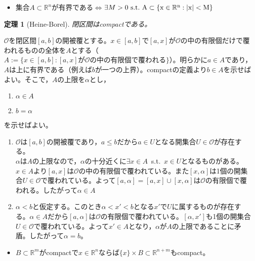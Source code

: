 \documentclass[dvipdfmx,a4j,10pt]{jsarticle}
\makeatletter
\theoremstyle{mystyle1}
\newtheorem{thm}[dfn]{定理}
\theoremstyle{mystyle2}
\renewenvironment{proof}[1][\proofname]{\par
  \pushQED{\qed}%
  \normalfont
  \topsep6\p@\@plus6\p@ \trivlist
  \item[\hskip\labelsep{\bfseries\sffamily #1}]\ignorespaces
}{%
  \popQED\endtrivlist\@endpefalse
}
\renewcommand\proofname{証明}
\makeatother
\begin{document}
\begin{itemize}
\item 集合$A\subset\mathbb{R}^n$が有界である$\Leftrightarrow$$\exists M>0\ \rm{s.t.}\ A\subset\{x\in\mathbb{R}^n:|x|<M\}$
\end{itemize}

\newpage

\begin{framed}
\begin{thm}[Heine-Borel]
    閉区間はcompactである。
\end{thm}
\end{framed}

\begin{proof}
$\mathscr{O}$を閉区間$[a,b]$の開被覆とする。$x\in[a,b]$で$[a,x]$が$\mathscr{O}$の中の有限個だけで覆われるものの全体を$A$とする（$A:=\{x\in[a,b]:[a,x]が\mathscr{O}の中の有限個で覆われる\}$）。明らかに$a\in A$であり，$A$は上に有界である（例えば$b$が一つの上界）。compactの定義より$b\in A$を示せばよい。そこで，$A$の上限を$\alpha$とし，
\begin{enumerate}
\item $\alpha\in A$
\item $b=\alpha$
\end{enumerate}
を示せばよい。
\begin{enumerate}
\item $\mathscr{O}$は$[a,b]$の開被覆であり，$a\leq b$だから$a\in U$となる開集合$U\in\mathscr{O}$が存在する。\\
$\alpha$は$A$の上限なので，$\alpha$の十分近くに$\exists x\in A$\ \rm{s.t.}\ $x\in U$となるものがある。$x\in A$より$[a,x]$は$\mathscr{O}$の中の有限個で覆われている。また$[x,\alpha]$は1個の開集合$U\in\mathscr{O}$で覆われている。よって$[a,\alpha]=[a,x]\cup[x,\alpha]$は$\mathscr{O}$の有限個で覆われる。したがって$\alpha\in A$

\item $\alpha<b$と仮定する。このとき$\alpha<x'<b$となる$x'$で$U$に属するものが存在する。$\alpha\in A$だから$[a,\alpha]$は$\mathscr{O}$の有限個で覆われている。$[\alpha,x']$も1個の開集合$U\in\mathscr{O}$で覆われている。よって$x'\in A$となり，$\alpha$が$A$の上限であることに矛盾。したがって$\alpha=b$。
\end{enumerate}

\end{proof}

\begin{itemize}
\item $B\subset\mathbb{R}^m$がcompactで$x\in\mathbb{R}^n$ならば$\{x\}\times B\subset\mathbb{R}^{n+m}$もcompact。
\end{itemize}
\end{document}
